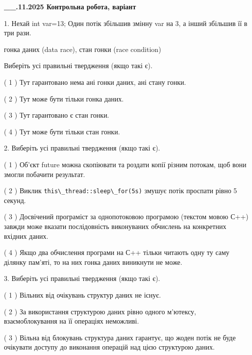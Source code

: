\documentclass[12pt, ukrainian]{article}
\def\code#1{\Verb!#1!}
\begin{document}
\newpage
\begin {large}

\textbf{\_\_.11.2025 Контрольна робота, варіант  }\par


{
1. Нехай int var=13; Один потік збільшив змінну var на 3, а інший збільшив її в три рази.

гонка даних (data race), стан гонки (race condition)

Виберіть усі правильні твердження (якщо такі є).\par
\vspace{2mm}
( 1 ) Тут гарантовано нема ані гонки даних, ані стану гонки.%

( 2 ) Тут може бути тільки гонка даних.%

( 3 ) Тут гарантовано є стан гонки.%

( 4 ) Тут може бути тільки стан гонки.%


2. Виберіть усі правильні твердження (якщо такі є).\par
\vspace{2mm}

( 1 ) Об’єкт future можна скопіювати та роздати копії різним потокам, щоб вони змогли побачити результат.%

( 2 ) Виклик \code{this\_thread::sleep\_for(5s)} змушує потік проспати рівно 5 секунд.%

( 3 ) Досвічений програміст за однопотоковою програмою (текстом мовою С++) завжди може вказати послідовність виконуваних обчислень на конкретних вхідних даних.%

( 4 ) Якщо два обчислення програми на С++ тільки читають одну ту саму ділянку пам'яті, то на них гонка даних  виникнути не може.%


3. Виберіть усі правильні твердження (якщо такі є).\par
\vspace{2mm}

( 1 ) Вільних від очікувань структур даних не існує.%

( 2 ) За використання структурою даних рівно одного м’ютексу, взаємоблокування на її операціях неможливі.%

( 3 ) Вільна від блокувань структура даних гарантує, що жоден потік не буде очікувати доступу до виконання операцій над цією структурою даних.%

}
\end{large}
\end{document}
